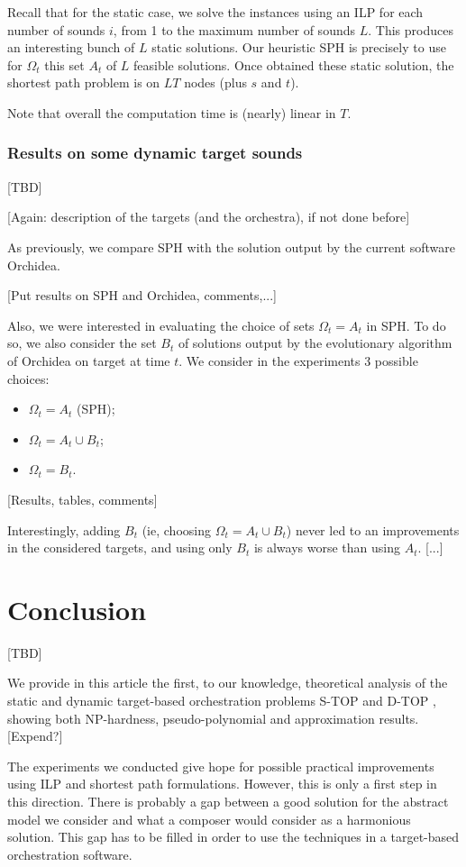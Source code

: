 \documentclass[a4paper]{book}
\newcommand{\stat}{{\sc S-TOP }}
\newcommand{\dyn}{{\sc D-TOP }}
\newcommand{\sectionToc}[1]{\section*{#1} \addcontentsline{toc}{section}{#1} \markboth{#1}{}}
\begin{document}
Recall that for the static case, we solve the instances using an ILP for each number of sounds $i$, from 1 to the maximum number of sounds $L$. This produces an interesting bunch of $L$ static solutions. Our heuristic SPH is precisely to use for $\Omega_t$ this set $A_t$ of $L$ feasible solutions. Once obtained these static solution, the shortest path problem is on $LT$ nodes (plus $s$ and $t$). 

Note that overall the computation time is (nearly) linear in $T$.  


\subsubsection{Results on some dynamic target sounds}

[TBD]

[Again: description of the targets (and the orchestra), if not done before]

As previously, we compare SPH with the solution output by the current software Orchidea. 

[Put results on SPH and Orchidea, comments,...]

Also, we were interested in evaluating the choice of sets $\Omega_t=A_t$ in SPH. To do so, we also consider the set $B_t$ of solutions output by the evolutionary algorithm of Orchidea on target at time $t$. We consider in the experiments 3 possible choices:
\begin{itemize}
    \item $\Omega_t=A_t$ (SPH);
    \item $\Omega_t=A_t\cup B_t$;
    \item $\Omega_t=B_t$.
\end{itemize}

[Results, tables, comments]

Interestingly, adding $B_t$ (ie, choosing $\Omega_t=A_t\cup B_t$) never led to an improvements in the considered targets, and using only $B_t$ is always worse than using $A_t$. 
[...]

\section{Conclusion}

[TBD]

We provide in this article the first, to our knowledge, theoretical analysis of the static and dynamic target-based orchestration problems \stat and \dyn, showing both NP-hardness, pseudo-polynomial and approximation results. [Expend?]

The experiments we conducted give hope for possible practical improvements using ILP and shortest path formulations. However, this is only a first step in this direction. There is probably a gap between a good solution for the abstract model we consider and what a composer would consider as a harmonious solution. This gap has to be filled in order to use the techniques in a target-based orchestration software. 





\end{document}
